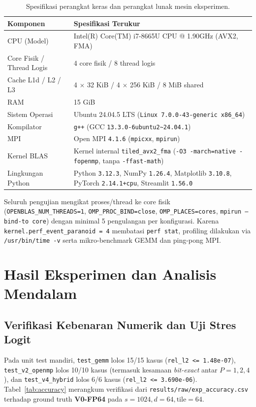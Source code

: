 \documentclass[11pt,a4paper]{article}
\begin{document}
\begin{table}[H]
\centering
\caption{Spesifikasi perangkat keras dan perangkat lunak mesin eksperimen.}
\begin{tabular}{ll}
\toprule
\textbf{Komponen} & \textbf{Spesifikasi Terukur} \\
\midrule
CPU (Model) & Intel(R) Core(TM) i7-8665U CPU @ 1.90GHz (AVX2, FMA) \\
Core Fisik / Thread Logis & 4 core fisik / 8 thread logis \\
Cache L1d / L2 / L3 & 4 $\times$ 32 KiB / 4 $\times$ 256 KiB / 8 MiB shared \\
RAM & 15 GiB \\
Sistem Operasi & Ubuntu 24.04.5 LTS (\texttt{Linux 7.0.0-43-generic x86\_64}) \\
Kompilator & \texttt{g++} (GCC \texttt{13.3.0-6ubuntu2\textasciitilde 24.04.1}) \\
MPI & Open MPI \texttt{4.1.6} (\texttt{mpicxx}, \texttt{mpirun}) \\
Kernel BLAS & Kernel internal \texttt{tiled\_avx2\_fma} (\texttt{-O3 -march=native -fopenmp}, tanpa \texttt{-ffast-math}) \\
Lingkungan Python & Python \texttt{3.12.3}, NumPy \texttt{1.26.4}, Matplotlib \texttt{3.10.8}, PyTorch \texttt{2.14.1+cpu}, Streamlit \texttt{1.56.0} \\
\bottomrule
\end{tabular}
\end{table}

Seluruh pengujian mengikat proses/thread ke core fisik (\texttt{OPENBLAS\_NUM\_THREADS=1}, \texttt{OMP\_PROC\_BIND=close}, \texttt{OMP\_PLACES=cores}, \texttt{mpirun --bind-to core}) dengan minimal 5 pengulangan per konfigurasi. Karena \texttt{kernel.perf\_event\_paranoid = 4} membatasi \texttt{perf stat}, profiling dilakukan via \texttt{/usr/bin/time -v} serta mikro-benchmark GEMM dan ping-pong MPI.

\section{Hasil Eksperimen dan Analisis Mendalam}

\subsection{Verifikasi Kebenaran Numerik dan Uji Stres Logit}
Pada unit test mandiri, \texttt{test\_gemm} lolos 15/15 kasus (\texttt{rel\_l2 <= 1.48e-07}), \texttt{test\_v2\_openmp} lolos 10/10 kasus (termasuk kesamaan \emph{bit-exact} antar $P=1,2,4$), dan \texttt{test\_v4\_hybrid} lolos 6/6 kasus (\texttt{rel\_l2 <= 3.690e-06}). Tabel~\ref{tab:accuracy} merangkum verifikasi dari \texttt{results/raw/exp\_accuracy.csv} terhadap ground truth \textbf{V0-FP64} pada $s=1024, d=64, \text{tile}=64$.
\end{document}
